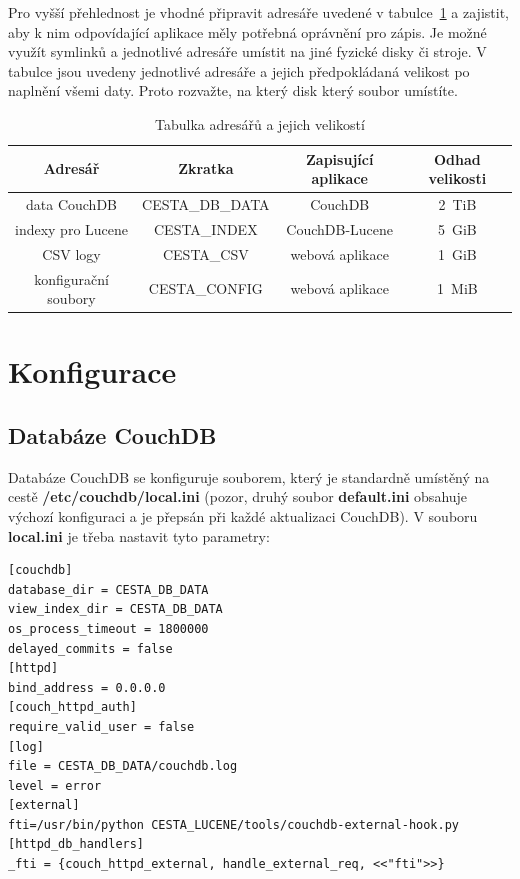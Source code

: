 Pro vyšší přehlednost je vhodné připravit adresáře uvedené v tabulce~\ref{tab:dirs} a zajistit, aby k nim odpovídající aplikace měly potřebná oprávnění pro zápis. Je možné využít symlinků a jednotlivé adresáře umístit na jiné fyzické disky či stroje. V tabulce jsou uvedeny jednotlivé adresáře a jejich předpokládaná velikost po naplnění všemi daty. Proto rozvažte, na který disk který soubor umístíte.

\begin{table}
\centering
\begin{tabular}{|c|c|c|c|}
\hline
Adresář & Zkratka & Zapisující aplikace & Odhad velikosti \\
\hline
\hline
data CouchDB & CESTA\_DB\_DATA & CouchDB & 2~TiB \\
\hline
indexy pro Lucene & CESTA\_INDEX & CouchDB-Lucene & 5~GiB \\
\hline
CSV logy & CESTA\_CSV & webová aplikace & 1~GiB \\
\hline
konfigurační soubory & CESTA\_CONFIG & webová aplikace & 1~MiB \\
\hline
\end{tabular}
\caption{Tabulka adresářů a jejich velikostí}
\label{tab:dirs}
\end{table}

\section{Konfigurace}

\subsection{Databáze CouchDB}

Databáze CouchDB se konfiguruje souborem, který je standardně umístěný na cestě {\bf /etc/couchdb/local.ini} (pozor, druhý soubor {\bf default.ini} obsahuje výchozí konfiguraci a je přepsán při každé aktualizaci CouchDB). V souboru {\bf local.ini} je třeba nastavit tyto parametry:

\begin{verbatim}
[couchdb]
database_dir = CESTA_DB_DATA
view_index_dir = CESTA_DB_DATA
os_process_timeout = 1800000
delayed_commits = false
[httpd]
bind_address = 0.0.0.0
[couch_httpd_auth]
require_valid_user = false
[log]
file = CESTA_DB_DATA/couchdb.log
level = error
[external]
fti=/usr/bin/python CESTA_LUCENE/tools/couchdb-external-hook.py
[httpd_db_handlers]
_fti = {couch_httpd_external, handle_external_req, <<"fti">>}
\end{verbatim}

